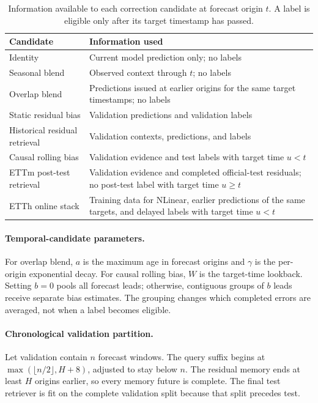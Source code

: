 \begin{table}[h]
\centering
\small
\setlength{\tabcolsep}{5pt}
\caption{Information available to each correction candidate at forecast
origin $t$. A label is eligible only after its target timestamp has passed.}
\label{tab:candidate-availability}
\begin{tabular}{p{}p{}}
\toprule
Candidate & Information used\\
\midrule
Identity & Current model prediction only; no labels\\
Seasonal blend & Observed context through $t$; no labels\\
Overlap blend & Predictions issued at earlier origins for the same target
timestamps; no labels\\
Static residual bias & Validation predictions and validation labels\\
Historical residual retrieval & Validation contexts, predictions, and labels\\
Causal rolling bias & Validation evidence and test labels with target time
$u<t$\\
ETTm post-test retrieval & Validation evidence and completed official-test
residuals; no post-test label with target time $u\ge t$\\
ETTh online stack & Training data for NLinear, earlier predictions of the same
targets, and delayed labels with target time $u<t$\\
\bottomrule
\end{tabular}
\end{table}

\paragraph{Temporal-candidate parameters.}
For overlap blend, $a$ is the maximum age in forecast origins and $\gamma$ is
the per-origin exponential decay. For causal rolling bias, $W$ is the
target-time lookback. Setting $b=0$ pools all forecast leads; otherwise,
contiguous groups of $b$ leads receive separate bias estimates. The grouping
changes which completed errors are averaged, not when a label becomes
eligible.

\paragraph{Chronological validation partition.}
Let validation contain $n$ forecast windows. The query suffix begins at
$\max(\lfloor n/2\rfloor,H+8)$, adjusted to stay below $n$. The residual
memory ends at least $H$ origins earlier, so every memory future is complete.
The final test retriever is fit on the complete validation split because that
split precedes test.


